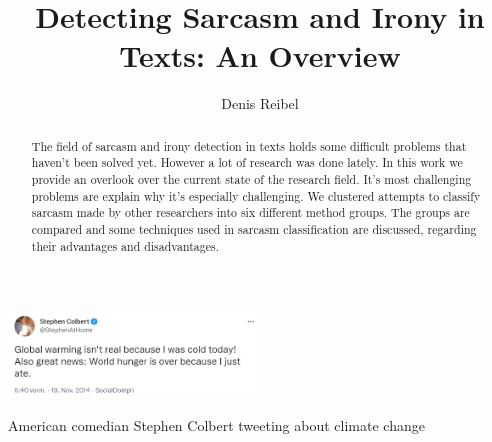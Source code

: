 \documentclass[sigconf,  review=false, nonacm=true]{acmart}
\begin{document}
\title{Detecting Sarcasm and Irony in Texts: An Overview}

\author{Denis Reibel}

\renewcommand{\shortauthors}{Denis Reibel}

\begin{abstract}
  The field of sarcasm and irony detection in texts holds some difficult problems that haven't been solved yet. However a lot of research was done lately. In this work we provide an overlook over the current state of the research field. It's most challenging problems are explain why it's especially challenging. We clustered attempts to classify sarcasm made by other researchers into six different method groups. The groups are compared and some techniques used in sarcasm classification are discussed, regarding their advantages and disadvantages.
\end{abstract}


\begin{teaserfigure}
  \centering
  \includegraphics[width=0.5\textwidth]{./sources/teaser_tweet}
  \caption{American comedian Stephen Colbert tweeting about climate change}
  \label{fig:teaser}
\end{teaserfigure}
\end{document}
